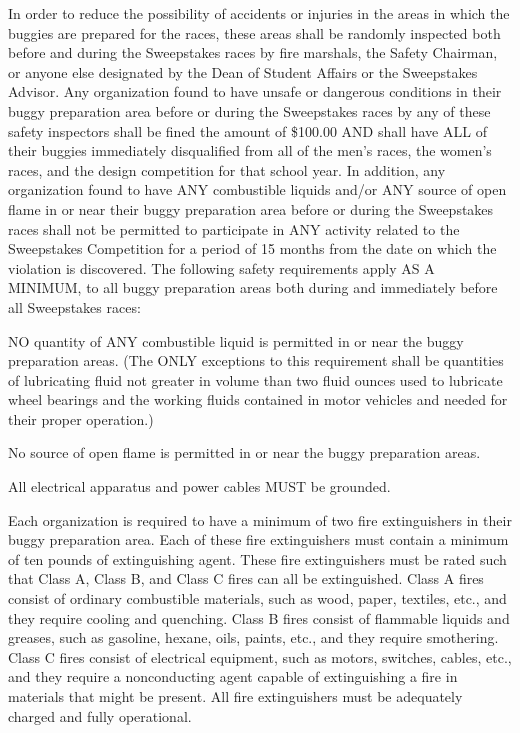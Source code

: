 	In order to reduce the possibility of accidents or injuries in the areas in which the buggies are prepared for the races, these areas shall be randomly inspected both before and during the Sweepstakes races by fire marshals, the Safety Chairman, or anyone else designated by the Dean of Student Affairs or the Sweepstakes Advisor. Any organization found to have unsafe or dangerous conditions in their buggy preparation area before or during the Sweepstakes races by any of these safety inspectors shall be fined the amount of \$100.00 AND shall have ALL of their buggies immediately disqualified from all of the men's races, the women's races, and the design competition for that school year. In addition, any organization found to have ANY combustible liquids and/or ANY source of open flame in or near their buggy preparation area before or during the Sweepstakes races shall not be permitted to participate in ANY activity related to the Sweepstakes Competition for a period of 15 months from the date on which the violation is discovered. The following safety requirements apply AS A MINIMUM, to all buggy preparation areas both during and immediately before all Sweepstakes races:

	NO quantity of ANY combustible liquid is permitted in or near the buggy preparation areas. (The ONLY exceptions to this requirement shall be quantities of lubricating fluid not greater in volume than two fluid ounces used to lubricate wheel bearings and the working fluids contained in motor vehicles and needed for their proper operation.)

	No source of open flame is permitted in or near the buggy preparation areas.

	All electrical apparatus and power cables MUST be grounded.

	Each organization is required to have a minimum of two fire extinguishers in their buggy preparation area. Each of these fire extinguishers must contain a minimum of ten pounds of extinguishing agent. These fire extinguishers must be rated such that Class A, Class B, and Class C fires can all be extinguished. Class A fires consist of ordinary combustible materials, such as wood, paper, textiles, etc., and they require cooling and quenching. Class B fires consist of flammable liquids and greases, such as gasoline, hexane, oils, paints, etc., and they require smothering. Class C fires consist of electrical equipment, such as motors, switches, cables, etc., and they require a nonconducting agent capable of extinguishing a fire in materials that might be present. All fire extinguishers must be adequately charged and fully operational.

